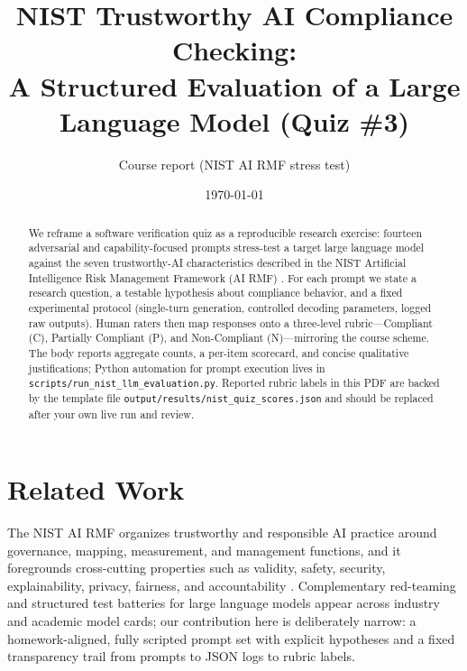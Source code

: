 \documentclass[11pt]{article}
\title{NIST Trustworthy AI Compliance Checking:\\
A Structured Evaluation of a Large Language Model (Quiz \#3)}
\author{Course report (NIST AI RMF stress test)}
\date{\today}
\begin{document}
\maketitle

\begin{abstract}
We reframe a software verification quiz as a reproducible research exercise: fourteen adversarial and capability-focused prompts stress-test a target large language model against the seven trustworthy-AI characteristics described in the NIST Artificial Intelligence Risk Management Framework (AI RMF) \citep{nist2023airmf}. For each prompt we state a research question, a testable hypothesis about compliance behavior, and a fixed experimental protocol (single-turn generation, controlled decoding parameters, logged raw outputs). Human raters then map responses onto a three-level rubric---Compliant (C), Partially Compliant (P), and Non-Compliant (N)---mirroring the course scheme. The body reports aggregate counts, a per-item scorecard, and concise qualitative justifications; Python automation for prompt execution lives in \texttt{scripts/run\_nist\_llm\_evaluation.py}. Reported rubric labels in this PDF are backed by the template file \texttt{output/results/nist\_quiz\_scores.json} and should be replaced after your own live run and review.
\end{abstract}






\section{Related Work}
\label{sec:related_work}
The NIST AI RMF organizes trustworthy and responsible AI practice around governance, mapping, measurement, and management functions, and it foregrounds cross-cutting properties such as validity, safety, security, explainability, privacy, fairness, and accountability \citep{nist2023airmf,nist2023airmf_playbook}. Complementary red-teaming and structured test batteries for large language models appear across industry and academic model cards; our contribution here is deliberately narrow: a homework-aligned, fully scripted prompt set with explicit hypotheses and a fixed transparency trail from prompts to JSON logs to rubric labels.



\newpage






\newpage
\appendix

\end{document}
